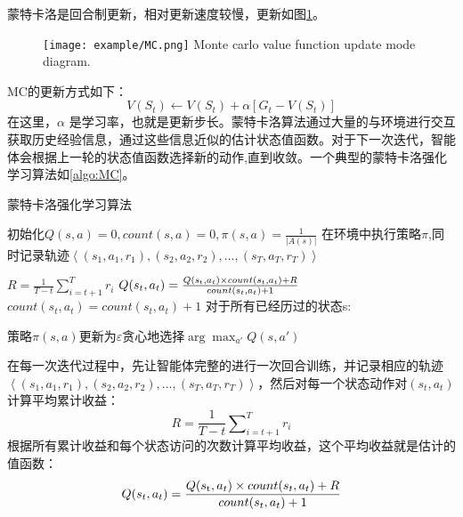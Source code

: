 蒙特卡洛是回合制更新，相对更新速度较慢，更新如图\ref{fig:5}。
\begin{figure}[htpb]
	\centering
	\texttt{[image: example/MC.png]}
	{Monte carlo value function update mode diagram.}
	\label{fig:5}
\end{figure}
MC的更新方式如下：
\begin{equation}
\label{eq:mc}
V({S_t}) \leftarrow V({S_t}) + \alpha [{G_t} - V({S_t})]
\end{equation}
在这里，$\alpha$ 是学习率，也就是更新步长。蒙特卡洛算法通过大量的与环境进行交互获取历史经验信息，通过这些信息近似的估计状态值函数。对于下一次迭代，智能体会根据上一轮的状态值函数选择新的动作,直到收敛。一个典型的蒙特卡洛强化学习算法如\ref{algo:MC}。

\begin{algorithm}
	\caption{蒙特卡洛强化学习算法}
	\label{algo:MC}
	\begin{algorithmic}[1] %
		\State 初始化$Q(s,a) = 0,count(s,a) = 0,\pi (s,a) = \frac{1}{{|A(s)|}}$
		\State 在环境中执行策略$\pi$,同时记录轨迹$\left\langle {({s_1},{a_1},{r_1}),({s_2},{a_2},{r_2}),...,({s_T},{a_T},{r_T})} \right\rangle  $
		
		\State $R = \frac{1}{{T - t}}\sum\nolimits_{i = t + 1}^T {{r_i}} $
		\State $Q({s_t},{a_t}) = \frac{{Q({s_{\rm{t}}},{a_t}) \times count({s_t},{a_t}) + R}}{{count({s_t},{a_t}) + 1}} $
		\State $count({s_t},{a_t}) = count({s_t},{a_t}) + 1$
		\EndFor
		\State 对于所有已经历过的状态s:
		      
		      策略$\pi (s,a)$更新为$\varepsilon $贪心地选择$\arg {\max _{a'}}Q(s,a')$
		\EndFor
	\end{algorithmic}
\end{algorithm}
在每一次迭代过程中，先让智能体完整的进行一次回合训练，并记录相应的轨迹$\left\langle {({s_1},{a_1},{r_1}),({s_2},{a_2},{r_2}),...,({s_T},{a_T},{r_T})} \right\rangle  $，然后对每一个状态动作对$({s_t},{a_t}) $计算平均累计收益：
\begin{equation}
\label{eq:reward}
R = \frac{1}{{T - t}}\sum\nolimits_{i = t + 1}^T {{r_i}} 
\end{equation}
根据所有累计收益和每个状态访问的次数计算平均收益，这个平均收益就是估计的值函数：
\begin{equation}
\label{eq:reward2}
Q({s_t},{a_t}) = \frac{{Q({s_{\rm{t}}},{a_t}) \times count({s_t},{a_t}) + R}}{{count({s_t},{a_t}) + 1}} 
\end{equation}
